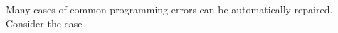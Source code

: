 \documentclass[sigplan,screen]{acmart} %
\begin{document}
Many cases of common programming errors can be automatically repaired.
%
%
%
Consider the case
\end{document}
